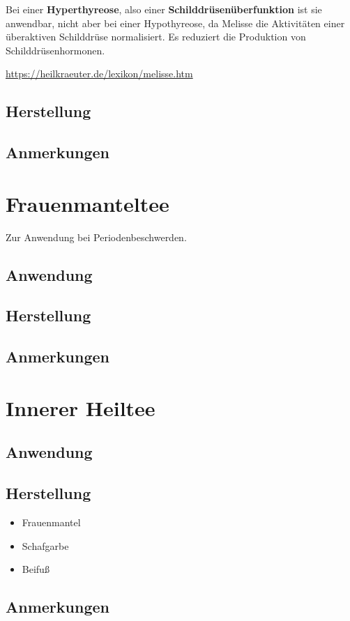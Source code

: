 Bei einer \textbf{Hyperthyreose}, also einer \textbf{Schilddrüsenüberfunktion} ist sie anwendbar, nicht aber bei einer Hypothyreose, da Melisse die Aktivitäten einer überaktiven Schilddrüse normalisiert. Es reduziert die Produktion von Schilddrüsenhormonen.


\cite{heilkraeuterlexikon}  

\url{https://heilkraeuter.de/lexikon/melisse.htm}

\subsection{Herstellung}

\subsection{Anmerkungen}



\newpage



\section{Frauenmanteltee}

Zur Anwendung bei Periodenbeschwerden.

 

\subsection{Anwendung}

\subsection{Herstellung}

\subsection{Anmerkungen}



\newpage



\section{Innerer Heiltee}

\subsection{Anwendung}

\subsection{Herstellung}

\begin{itemize}
	\item Frauenmantel 
	\item Schafgarbe
	\item Beifuß
\end{itemize}

\subsection{Anmerkungen}



